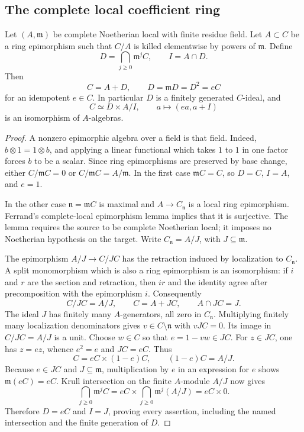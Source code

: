 \subsection{The complete local coefficient ring}

\begin{lemma}
\label{lem:complete-epic-decomposition}
Let $(A,\mathfrak m)$ be complete Noetherian local with finite
residue field.  Let $A\subset C$ be a ring epimorphism such that
$C/A$ is killed elementwise by powers of $\mathfrak m$.  Define
\[
 D=\bigcap_{j\ge0}\mathfrak m^jC,\qquad I=A\cap D.
\]
Then
\[
 C=A+D,\qquad D=\mathfrak mD=D^2=eC
\]
for an idempotent $e\in C$.  In particular $D$ is a finitely
generated $C$-ideal, and
\[
 C\simeq D\times A/I,\qquad a\longmapsto(ea,a+I)
\]
is an isomorphism of $A$-algebras.
\end{lemma}
\begin{proof}
A nonzero epimorphic algebra over a field is that field.
Indeed, $b\otimes1=1\otimes b$, and applying a linear functional
which takes $1$ to $1$ in one factor forces $b$ to be a scalar.
Since ring epimorphisms are preserved by base change, either
$C/\mathfrak mC=0$ or $C/\mathfrak mC=A/\mathfrak m$.
In the first case $\mathfrak mC=C$, so $D=C$, $I=A$, and $e=1$.

In the other case $\mathfrak n=\mathfrak mC$ is maximal and
$A\to C_{\mathfrak n}$ is a local ring epimorphism.
Ferrand's complete-local epimorphism lemma
\cite[Lemma 2.1, p.\ 5]{Ferrand1968NoetherianMonomorphisms}
implies that it is surjective.  The lemma requires the source to
be complete Noetherian local; it imposes no Noetherian hypothesis
on the target.  Write $C_{\mathfrak n}=A/J$, with $J\subseteq
\mathfrak m$.

The epimorphism $A/J\to C/JC$ has the retraction induced by
localization to $C_{\mathfrak n}$.  A split monomorphism which is
also a ring epimorphism is an isomorphism: if $i$ and $r$ are the
section and retraction, then $ir$ and the identity agree after
precomposition with the epimorphism $i$.
Consequently
\[
 C/JC=A/J,\qquad C=A+JC,\qquad A\cap JC=J.
\]
The ideal $J$ has finitely many $A$-generators, all zero in
$C_{\mathfrak n}$.  Multiplying finitely many localization
denominators gives $v\in C\setminus\mathfrak n$ with $vJC=0$.
Its image in $C/JC=A/J$ is a unit.  Choose $w\in C$ so that
$e=1-vw\in JC$.  For $z\in JC$, one has $z=ez$, whence
$e^2=e$ and $JC=eC$.  Thus
\[
 C=eC\times(1-e)C,\qquad (1-e)C=A/J.
\]
Because $e\in JC$ and $J\subseteq\mathfrak m$, multiplication
by $e$ in an expression for $e$ shows
$\mathfrak m(eC)=eC$.  Krull intersection on the finite
$A$-module $A/J$ now gives
\[
 \bigcap_{j\ge0}\mathfrak m^jC
   =eC\times\bigcap_{j\ge0}\mathfrak m^j(A/J)
   =eC\times0.
\]
Therefore $D=eC$ and $I=J$, proving every assertion, including
the named intersection and the finite generation of $D$.
\end{proof}

